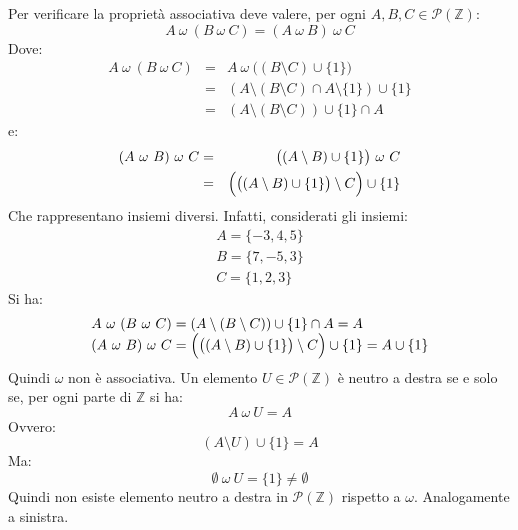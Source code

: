 \begin{enumerate}
\begin{displaymath}
	\end{displaymath}
	Per verificare la proprietà associativa deve valere, per ogni $A,B,C \in \mathcal{P}(\mathbb{Z})$:
	\begin{displaymath}
		A \ \omega \ (B \ \omega \ C) = (A \ \omega \ B) \ \omega \ C
	\end{displaymath}
	Dove:
	\begin{eqnarray*}
		A \ \omega \ (B \ \omega \ C) &=& A \ \omega \ \bigl( (B \setminus C) \cup \{1\}\bigr) \\
		&=& (A \setminus (B \setminus C) \cap A \setminus \{1\}) \cup \{1\} \\
		&=& (A \setminus (B \setminus C))\cup \{1\} \cap A
	\end{eqnarray*}
	e:
	\begin{eqnarray*}
		(A \ \omega \ B) \ \omega \ C &=&\bigl( (A \setminus B) \cup \{1\}\bigr) \ \omega \ C \\
		&=& \Bigl( \bigl((A \setminus B) \cup \{1\} \bigr)\setminus C \Bigr) \cup \{1\}
	\end{eqnarray*}
	Che rappresentano insiemi diversi. Infatti, considerati gli insiemi:
	\begin{displaymath}
		\begin{array}{l}
			A = \{-3,4,5\} \\
			B = \{7,-5,3\} \\
			C = \{1,2,3\}
		\end{array}
	\end{displaymath}
	Si ha:
	\begin{displaymath}
		\begin{array}{l}
			A \ \omega \ (B \ \omega \ C) = (A \setminus (B \setminus C))\cup \{1\} \cap A  = A \\
			(A \ \omega \ B) \ \omega \ C = \Bigl( \bigl((A \setminus B) \cup \{1\} \bigr)\setminus C \Bigr) \cup \{1\} = A \cup \{1\}
		\end{array}
	\end{displaymath}
	Quindi $\omega$  non è associativa.
	Un elemento $U \in \mathcal{P}(\mathbb{Z})$ è neutro a destra se e solo se, per ogni parte di $\mathbb{Z}$ si ha:
	\begin{displaymath}
		A \ \omega \ U = A
	\end{displaymath}
	Ovvero:
	\begin{displaymath}
		(	A \setminus U) \cup \{1\} = A
	\end{displaymath}
	Ma:
	\begin{displaymath}
		\emptyset \ \omega \ U = \{1\} \neq \emptyset
	\end{displaymath}
	Quindi non esiste elemento neutro a destra in $\mathcal{P}(\mathbb{Z})$ rispetto a $\omega$. Analogamente a sinistra. \hfill \blacksquare
\end{enumerate}
